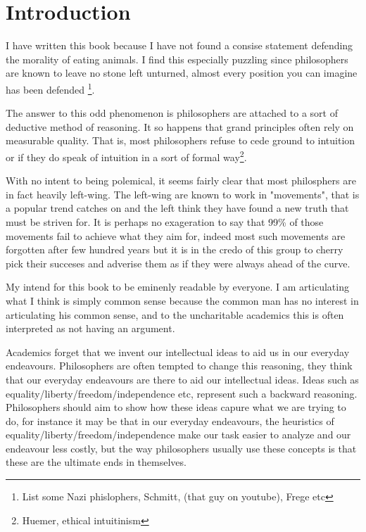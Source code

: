 \documentclass[12pt]{report}
\numberwithin{equation}{section}
\begin{document}
\section{Introduction}

I have written this book because I have not found a consise statement defending the morality of eating animals. I find this especially puzzling since philosophers are known to leave no stone left unturned, almost every position you can imagine has been defended \footnote{List some Nazi phislophers, Schmitt, (that guy on youtube), Frege etc}. 

The answer to this odd phenomenon is philosophers are attached to a sort of deductive method of reasoning. It so happens that grand principles often rely on measurable quality. That is, most philosophers refuse to cede ground to intuition or if they do speak of intuition in a sort of formal way\footnote{Huemer, ethical intuitinism}. 

With no intent to being polemical, it seems fairly clear that most philosphers are in fact heavily left-wing. The left-wing are known to work in "movements", that is a popular trend catches on and the left think they have found a new truth that must be striven for. It is perhaps no exageration to say that 99\% of those movements fail to achieve what they aim for, indeed most such movements are forgotten after few hundred years but it is in the credo of this group to cherry pick their succeses and adverise them as if they were always ahead of the curve. 

My intend for this book to be eminenly readable by everyone. I am articulating what I think is simply common sense because the common man has no interest in articulating his common sense, and to the uncharitable academics this is often interpreted as not having an argument. 

Academics forget that we invent our intellectual ideas to aid us in our everyday endeavours. Philosophers are often tempted to change this reasoning, they think that our everyday endeavours are there to aid our intellectual ideas. Ideas such as equality/liberty/freedom/independence etc, represent such a backward reasoning. Philosophers should aim to show how these ideas capure what we are trying to do, for instance it may be that in our everyday endeavours, the heuristics of equality/liberty/freedom/independence make our task easier to analyze and our endeavour less costly, but the way philosophers usually use these concepts is that these are the ultimate ends in themselves. 
\end{document}
